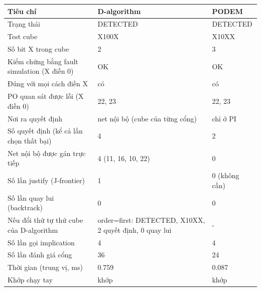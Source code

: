 \begin{tabular}{@{}lll@{}}
\toprule
Tiêu chí & D-algorithm & PODEM\\
\midrule
Trạng thái & DETECTED & DETECTED\\
Test cube & X100X & X10XX\\
Số bit X trong cube & 2 & 3\\
Kiểm chứng bằng fault simulation (X điền 0) & OK & OK\\
Đúng với mọi cách điền X & có & có\\
PO quan sát được lỗi (X điền 0) & 22, 23 & 22, 23\\
\midrule
Nơi ra quyết định & net nội bộ (cube của từng cổng) & chỉ ở PI\\
Số quyết định (kể cả lần chọn thất bại) & 4 & 2\\
Net nội bộ được gán trực tiếp & 4 (11, 16, 10, 22) & 0\\
Số lần justify (J-frontier) & 1 & 0 (không cần)\\
Số lần quay lui (backtrack) & 0 & 0\\
Nếu đổi thứ tự thử cube của D-algorithm & order=first: DETECTED, X10XX, 2 quyết định, 0 quay lui & -\\
\midrule
Số lần gọi implication & 4 & 4\\
Số lần đánh giá cổng & 36 & 24\\
Thời gian (trung vị, ms) & 0.759 & 0.087\\
\midrule
Khớp chạy tay & khớp & khớp\\
\bottomrule
\end{tabular}
